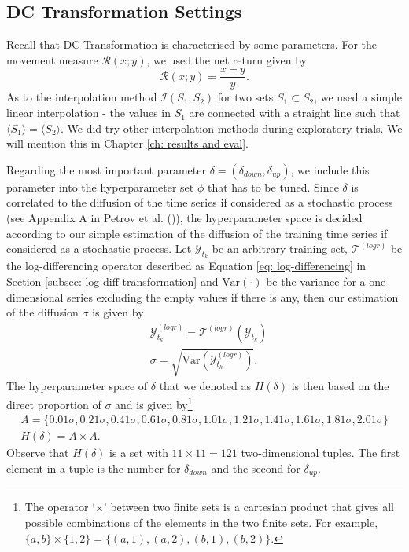 \subsection{DC Transformation Settings}
Recall that DC Transformation is characterised by some parameters. For the movement measure $\mathcal{R} (x; y)$, we used the net return given by
\begin{equation*}
    \mathcal{R} (x; y) = \frac{x - y}{y}.
\end{equation*}
As to the interpolation method $\mathcal{I} (S_1, S_2)$ for two sets $S_1 \subset S_2$, we used a simple linear interpolation - the values in $S_1$ are connected with a straight line such that $\langle S_1 \rangle = \langle S_2 \rangle$. We did try other interpolation methods during exploratory trials. We will mention this in Chapter \ref{ch: results and eval}.

Regarding the most important parameter $\delta = (\delta_{down}, \delta_{up})$, we include this parameter into the hyperparameter set $\phi$ that has to be tuned. Since $\delta$ is correlated to the diffusion of the time series if considered as a stochastic process (see Appendix A in Petrov et al. (\citeyear{petrov2018agent})), the hyperparameter space is decided according to our simple estimation of the diffusion of the training time series if considered as a stochastic process. Let $\mathcal{Y}_{t_k}$ be an arbitrary training set, $\mathcal{T}^{(logr)}$ be the log-differencing operator described as Equation \ref{eq: log-differencing} in Section \ref{subsec: log-diff transformation} and $\text{Var}(\cdot)$ be the variance for a one-dimensional series excluding the empty values if there is any, then our estimation of the diffusion $\sigma$ is given by
\begin{align*}
    &\mathcal{Y}^{(logr)}_{t_k} = \mathcal{T}^{(logr)}(\mathcal{Y}_{t_k}) \\
    &\sigma = \sqrt{\text{Var}(\mathcal{Y}^{(logr)}_{t_k})}.
\end{align*}
The hyperparameter space of $\delta$ that we denoted as $H(\delta)$ is then based on the direct proportion of $\sigma$ and is given by\footnote{The operator `$\times$' between two finite sets is a cartesian product that gives all possible combinations of the elements in the two finite sets. For example, $\{a, b \} \times \{ 1, 2 \} = \{ (a, 1), (a, 2), (b, 1), (b, 2) \}$.}
\begin{gather*}
    A = \{ 0.01 \sigma, 0.21 \sigma, 0.41 \sigma, 0.61 \sigma, 0.81 \sigma, 1.01 \sigma, 1.21 \sigma, 1.41 \sigma, 1.61 \sigma, 1.81 \sigma, 2.01 \sigma \} \\
    H(\delta) = A \times A.
\end{gather*}
Observe that $H(\delta)$ is a set with $11 \times 11 = 121$ two-dimensional tuples. The first element in a tuple is the number for $\delta_{down}$ and the second for $\delta_{up}$.

